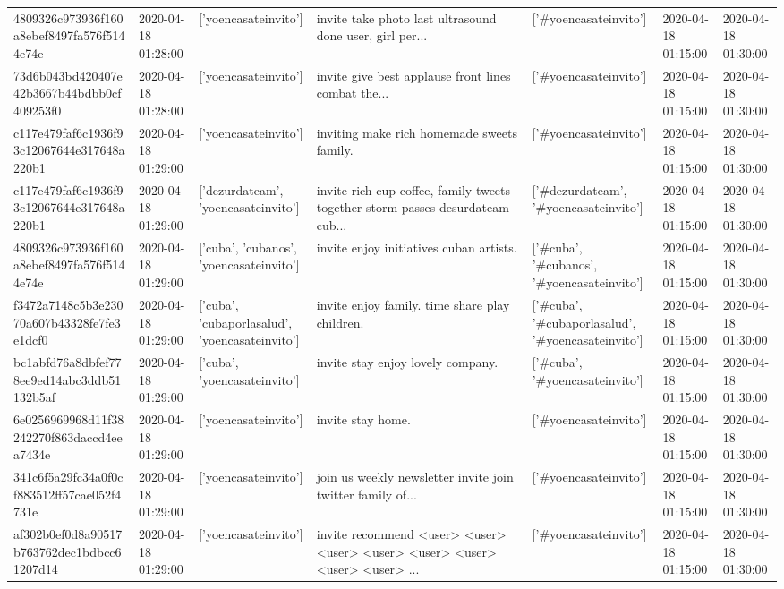 \begin{tabular}{lllllll}
4809326c973936f160a8ebef8497fa576f5144e74e & 2020-04-18 01:28:00 & ['yoencasateinvito'] & invite take photo last ultrasound done user, girl per... & ['#yoencasateinvito'] & 2020-04-18 01:15:00 & 2020-04-18 01:30:00 \\
73d6b043bd420407e42b3667b44bdbb0cf409253f0 & 2020-04-18 01:28:00 & ['yoencasateinvito'] & invite give best applause front lines combat the... & ['#yoencasateinvito'] & 2020-04-18 01:15:00 & 2020-04-18 01:30:00 \\
c117e479faf6c1936f93c12067644e317648a220b1 & 2020-04-18 01:29:00 & ['yoencasateinvito'] & inviting make rich homemade sweets family. & ['#yoencasateinvito'] & 2020-04-18 01:15:00 & 2020-04-18 01:30:00 \\
c117e479faf6c1936f93c12067644e317648a220b1 & 2020-04-18 01:29:00 & ['dezurdateam', 'yoencasateinvito'] & invite rich cup coffee, family tweets together storm passes desurdateam cub... & ['#dezurdateam', '#yoencasateinvito'] & 2020-04-18 01:15:00 & 2020-04-18 01:30:00 \\
4809326c973936f160a8ebef8497fa576f5144e74e & 2020-04-18 01:29:00 & ['cuba', 'cubanos', 'yoencasateinvito'] & invite enjoy initiatives cuban artists. & ['#cuba', '#cubanos', '#yoencasateinvito'] & 2020-04-18 01:15:00 & 2020-04-18 01:30:00 \\
f3472a7148c5b3e23070a607b43328fe7fe3e1dcf0 & 2020-04-18 01:29:00 & ['cuba', 'cubaporlasalud', 'yoencasateinvito'] & invite enjoy family. time share play children. & ['#cuba', '#cubaporlasalud', '#yoencasateinvito'] & 2020-04-18 01:15:00 & 2020-04-18 01:30:00 \\
bc1abfd76a8dbfef778ee9ed14abc3ddb51132b5af & 2020-04-18 01:29:00 & ['cuba', 'yoencasateinvito'] & invite stay enjoy lovely company. & ['#cuba', '#yoencasateinvito'] & 2020-04-18 01:15:00 & 2020-04-18 01:30:00 \\
6e0256969968d11f38242270f863daccd4eea7434e & 2020-04-18 01:29:00 & ['yoencasateinvito'] & invite stay home. & ['#yoencasateinvito'] & 2020-04-18 01:15:00 & 2020-04-18 01:30:00 \\
341c6f5a29fc34a0f0cf883512ff57cae052f4731e & 2020-04-18 01:29:00 & ['yoencasateinvito'] & join us weekly newsletter invite join twitter family of... & ['#yoencasateinvito'] & 2020-04-18 01:15:00 & 2020-04-18 01:30:00 \\
af302b0ef0d8a90517b763762dec1bdbcc61207d14 & 2020-04-18 01:29:00 & ['yoencasateinvito'] & invite recommend <user> <user> <user> <user> <user> <user> <user> <user> ... & ['#yoencasateinvito'] & 2020-04-18 01:15:00 & 2020-04-18 01:30:00 \\

\end{tabular}
